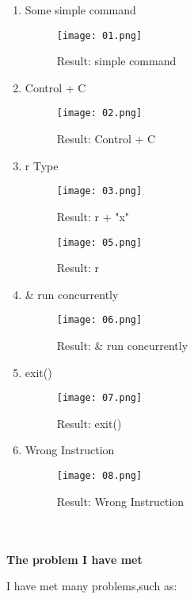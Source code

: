 \documentclass[12pt,a4paper]{article}
\begin{document}
\begin{enumerate}

\item Some simple command
\begin{figure}[H]
  \centering
  \texttt{[image: 01.png]}
  \caption{Result: simple command}%
\end{figure}
\item Control + C
\begin{figure}[H]
  \centering
  \texttt{[image: 02.png]}
  \caption{Result: Control + C}%
\end{figure}
\item r Type
\begin{figure}[H]
  \centering
  \texttt{[image: 03.png]}
  \caption{Result: r + "x"}%
\end{figure}

\begin{figure}[H]
  \centering
  \texttt{[image: 05.png]}
  \caption{Result: r}%
\end{figure}

\item \& run concurrently
\begin{figure}[H]
  \centering
  \texttt{[image: 06.png]}
  \caption{Result: \& run concurrently}%
\end{figure}

\item exit()

\begin{figure}[H]
  \centering
  \texttt{[image: 07.png]}
  \caption{Result: exit()}%
\end{figure}
\item Wrong Instruction

\begin{figure}[H]
  \centering
  \texttt{[image: 08.png]}
  \caption{Result: Wrong Instruction}%
\end{figure}
\end{enumerate}

\begin{large}
~\\
~\\
\textbf{The problem I have met}
\end{large}

I have met many problems,such as:
\end{document}
